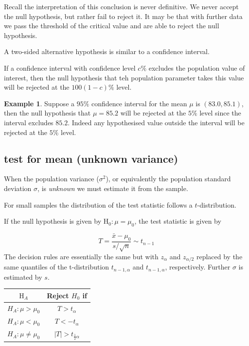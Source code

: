 \documentclass[
]{book}
\theoremstyle{definition}
\theoremstyle{definition}
\newtheorem{example}{Example}[chapter]
\theoremstyle{definition}
\theoremstyle{definition}
\theoremstyle{remark}
\begin{document}
Recall the interpretation of this conclusion is never definitive. We never accept the null hypothesis, but rather fail to reject it. It may be that with further data we pass the threshold of the critical value and are able to reject the null hypothesis.

A two-sided alternative hypothesis is similar to a confidence interval.

If a confidence interval with confidence level \(c\%\) excludes the population value of interest, then the null hypothesis that teh population parameter takes this value will be rejected at the \(100(1-c)\%\) level.

\begin{example}
Suppose a \(95\%\) confidence interval for the mean \(\mu\) is \((83.0,85.1)\), then the null hypothesis that \(\mu=85.2\) will be rejected at the \(5\%\) level since the interval excludes \(85.2\). Indeed any hypothesised value outside the interval will be rejected at the \(5\%\) level.
\end{example}

\hypertarget{test-for-mean-unknown-variance}{%
\subsection{test for mean (unknown variance)}\label{test-for-mean-unknown-variance}}

When the population variance (\(\sigma^2\)), or equivalently the population standard deviation \(\sigma\), is \emph{unknown} we must estimate it from the sample.

For small samples the distribution of the test statistic follows a \(t\)-distribution.

If the null hypothesis is given by \(\text{H}_0: \mu = \mu_0\), the test statistic is given by

\[T = \frac{\bar{x}-\mu_0}{s/\sqrt{n}}\sim t_{n-1}\]
The decision rules are essentially the same but with \(z_\alpha\) and \(z_{\alpha/2}\) replaced by the same quantiles of the t-distribution \(t_{n-1,\alpha}\) and \(t_{n-1,\alpha}\), respectively. Further \(\sigma\) is estimated by \(s\).

\begin{longtable}[]{@{}cc@{}}
\toprule
\(\text{H}_{A}\) & Reject \(H_{0}\) if\tabularnewline
\midrule
\endhead
\(H_{A}: \mu > \mu_0\) & \(T>t_{\alpha}\)\tabularnewline
\(H_{A}: \mu < \mu_0\) & \(T<-t_{\alpha}\)\tabularnewline
\(H_{A}: \mu \neq \mu_0\) & \(|T|>t_{\frac{1}{2}\alpha}\)\tabularnewline
\bottomrule
\end{longtable}
\end{document}
